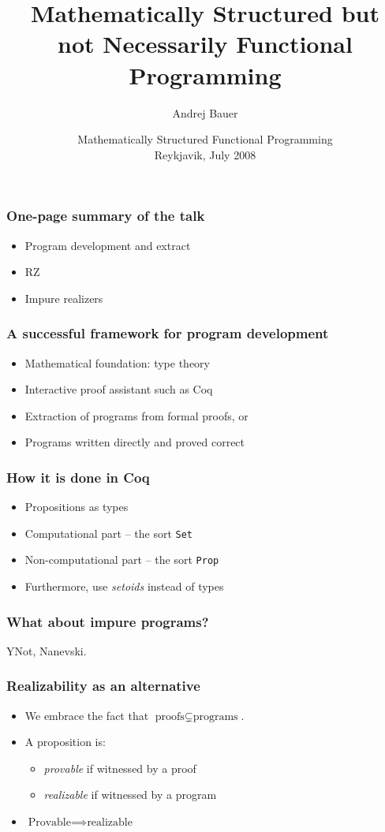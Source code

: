 \documentclass[t]{beamer}
\title{Mathematically Structured but\\
not Necessarily Functional Programming}
\author{Andrej Bauer}
\institute{Department of Mathematics and Physics\\
  University of Ljubljana, Slovenia}
\date{Mathematically Structured Functional Programming\\Reykjavik, July 2008}
\begin{document}
\begin{frame}
  \titlepage
\end{frame}

\begin{frame}
  \frametitle{One-page summary of the talk}

  \begin{itemize}
  \item Program development and extract
  \item RZ
  \item Impure realizers
  \end{itemize}
\end{frame}

\begin{frame}
  \frametitle{A successful framework for program development}

  \begin{itemize}
  \item Mathematical foundation: type theory
  \item Interactive proof assistant such as Coq
  \item Extraction of programs from formal proofs, or
  \item Programs written directly and proved correct
  \end{itemize}
\end{frame}

\begin{frame}
  \frametitle{How it is done in Coq}

  \begin{itemize}
  \item Propositions as types
  \item Computational part -- the sort \texttt{Set}
  \item Non-computational part -- the sort \texttt{Prop}
  \item Furthermore, use \emph{setoids} instead of types
  \end{itemize}

\end{frame}

\begin{frame}
  \frametitle{What about impure programs?}

  YNot, Nanevski.
\end{frame}


\begin{frame}
  \frametitle{Realizability as an alternative}

  \begin{itemize}
  \item We embrace the fact that $\text{proofs} \subsetneq \text{programs}$.
  \item A proposition is:
    \begin{itemize}
    \item \emph{provable} if witnessed by a proof
    \item \emph{realizable} if witnessed by a program
    \end{itemize}
  \item $\text{Provable} \implies \text{realizable}$
  \end{itemize}

\end{frame}
\end{document}
